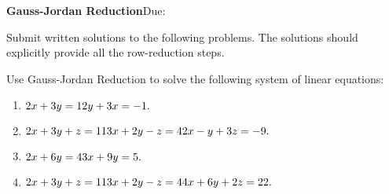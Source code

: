 \documentclass[11pt]{article}
\begin{document}
{\textbf{Gauss-Jordan Reduction}}\hfill {\small{Due: }}

\hrulefill

Submit written solutions to the following problems. The solutions should
explicitly provide all the row-reduction steps.


Use Gauss-Jordan Reduction to solve the following system of linear equations:

\begin{enumerate}
    \item $2x+3y = 1\\
        2y+3x = -1.$
    \item $2x+3y+z=11\\
        3x+2y-z=4\\
        2x-y+3z=-9.$
    \item $2x+6y=4\\
        3x+9y=5.$
    \item $2x+3y+z=11\\
        3x+2y-z=4\\
        4x+6y+2z=22.$
\end{enumerate}
\end{document}
